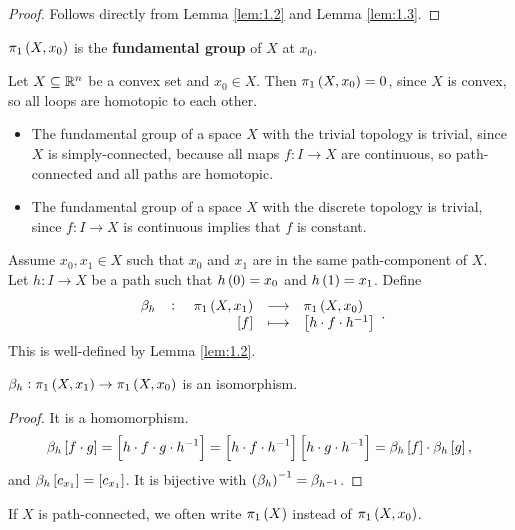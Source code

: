 \begin{proof}
Follows directly from Lemma \ref{lem:1.2} and Lemma \ref{lem:1.3}.
\end{proof}

\begin{definition*}
$ \pi_1\br{X, x_0} $ is the \textbf{fundamental group} of $ X $ at $ x_0 $.
\end{definition*}

\begin{example*}
Let $ X \subseteq \mathbb{R}^n $ be a convex set and $ x_0 \in X $. Then $ \pi_1\br{X, x_0} = 0 $, since $ X $ is convex, so all loops are homotopic to each other.
\end{example*}

\begin{example*}
\hfill
\begin{itemize}
\item The fundamental group of a space $ X $ with the trivial topology is trivial, since $ X $ is simply-connected, because all maps $ f : I \to X $ are continuous, so path-connected and all paths are homotopic.
\item The fundamental group of a space $ X $ with the discrete topology is trivial, since $ f : I \to X $ is continuous implies that $ f $ is constant.
\end{itemize}
\end{example*}

Assume $ x_0, x_1 \in X $ such that $ x_0 $ and $ x_1 $ are in the same path-component of $ X $. Let $ h : I \to X $ be a path such that $ h\br{0} = x_0 $ and $ h\br{1} = x_1 $. Define
$$ \function[\beta_h]{\pi_1\br{X, x_1}}{\pi_1\br{X, x_0}}{\sbr{f}}{\sbr{h \cdot f \cdot h^{-1}}}. $$
This is well-defined by Lemma \ref{lem:1.2}.

\begin{proposition}
$ \beta_h : \pi_1\br{X, x_1} \to \pi_1\br{X, x_0} $ is an isomorphism.
\end{proposition}

\begin{proof}
It is a homomorphism.
$$ \beta_h\sbr{f \cdot g} = \sbr{h \cdot f \cdot g \cdot h^{-1}} = \sbr{h \cdot f \cdot h^{-1}}\sbr{h \cdot g \cdot h^{-1}} = \beta_h\sbr{f} \cdot \beta_h\sbr{g}, $$
and $ \beta_h\sbr{c_{x_1}} = \sbr{c_{x_1}} $. It is bijective with $ \br{\beta_h}^{-1} = \beta_{h^{-1}} $.
\end{proof}

If $ X $ is path-connected, we often write $ \pi_1\br{X} $ instead of $ \pi_1\br{X, x_0} $.

